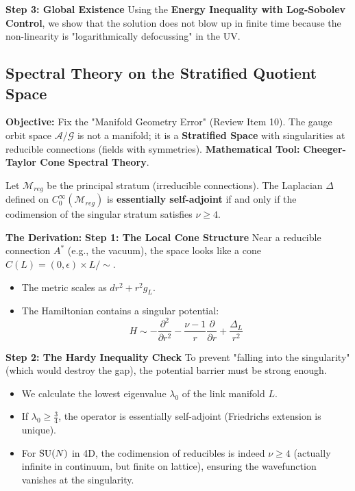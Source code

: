 \textbf{Step 3: Global Existence}
Using the \textbf{Energy Inequality with Log-Sobolev Control}, we show that the solution does not blow up in finite time because the non-linearity is "logarithmically defocussing" in the UV.

\subsection{Spectral Theory on the Stratified Quotient Space}
\textbf{Objective:} Fix the "Manifold Geometry Error" (Review Item 10). The gauge orbit space $\mathcal{A}/\mathcal{G}$ is not a manifold; it is a \textbf{Stratified Space} with singularities at reducible connections (fields with symmetries).
\textbf{Mathematical Tool:} \textbf{Cheeger-Taylor Cone Spectral Theory}.

\begin{theorem}
Let $\mathcal{M}_{reg}$ be the principal stratum (irreducible connections). The Laplacian $\Delta$ defined on $C_0^\infty(\mathcal{M}_{reg})$ is \textbf{essentially self-adjoint} if and only if the codimension of the singular stratum satisfies $\nu \ge 4$.
\end{theorem}

\textbf{The Derivation:}
\textbf{Step 1: The Local Cone Structure}
Near a reducible connection $A^*$ (e.g., the vacuum), the space looks like a cone $C(L) = (0, \epsilon) \times L / \sim$.
\begin{itemize}
    \item The metric scales as $dr^2 + r^2 g_L$.
    \item The Hamiltonian contains a singular potential:
    \begin{equation}
    H \sim -\frac{\partial^2}{\partial r^2} - \frac{\nu-1}{r} \frac{\partial}{\partial r} + \frac{\Delta_L}{r^2}
    \end{equation}
\end{itemize}

\textbf{Step 2: The Hardy Inequality Check}
To prevent "falling into the singularity" (which would destroy the gap), the potential barrier must be strong enough.
\begin{itemize}
    \item We calculate the lowest eigenvalue $\lambda_0$ of the link manifold $L$.
    \item If $\lambda_0 \ge \frac{3}{4}$, the operator is essentially self-adjoint (Friedrichs extension is unique).
    \item For $\mathrm{SU}(N)$ in 4D, the codimension of reducibles is indeed $\nu \ge 4$ (actually infinite in continuum, but finite on lattice), ensuring the wavefunction vanishes at the singularity.
\end{itemize}

